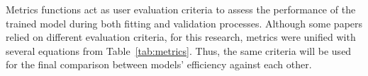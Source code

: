 %
%
Metrics functions act as user evaluation criteria to assess the performance of the trained model during both fitting and validation processes.
Although some papers relied on different evaluation criteria, for this research, metrics were unified with several equations from \mbox{Table~\ref{tab:metrics}}.
Thus, the same criteria will be used for the final comparison between models' efficiency against each other.
\begin{table}[htbp]
    \renewcommand{\arraystretch}{1.3}
    \caption{Model's metrics functions}
    \centering
    \label{tab:metrics}
\end{table}

